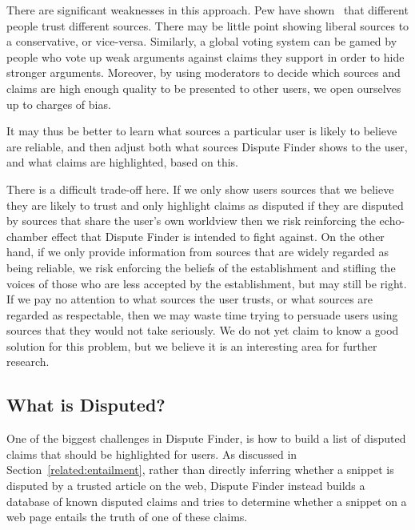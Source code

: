 \documentclass{www2010-submission}
\newcommand{\todo}[1]{}
\begin{document}
\todo{study result: verify}
There are significant weaknesses in this approach. Pew have shown~\cite{pew-news} that different people trust different sources. There may be little point showing liberal sources to a conservative, or vice-versa. Similarly, a global voting system can be gamed by people who vote up weak arguments against claims they support in order to hide stronger arguments. Moreover, by using moderators to decide which sources and claims are high enough quality to be presented to other users, we open ourselves up to charges of bias.

It may thus be better to learn what sources a particular user is likely to believe are reliable, and then adjust both what sources Dispute Finder shows to the user, and what claims are highlighted, based on this.

There is a difficult trade-off here. If we only show users sources that we believe they are likely to trust and only highlight claims as disputed if they are disputed by sources that share the user's own worldview then we risk reinforcing the echo-chamber effect that Dispute Finder is intended to fight against. On the other hand, if we only provide information from sources that are widely regarded as being reliable, we risk enforcing the beliefs of the establishment and stifling the voices of those who are less accepted by the establishment, but may still be right. If we pay no attention to what sources the user trusts, or what sources are regarded as respectable, then we may waste time trying to persuade users using sources that they would not take seriously. We do not yet claim to know a good solution for this problem, but we believe it is an interesting area for further research.

\todo{Cite Pew Research study saying people like to read news that supports their own point of view, but many others like neutral sources. http://people-press.org/report/?pageid=1353}


\subsection{What is Disputed?}

One of the biggest challenges in Dispute Finder, is how to build a list of disputed claims that should be highlighted for users. As discussed in Section~\ref{related:entailment}, rather than directly inferring whether a snippet is disputed by a trusted article on the web, Dispute Finder instead builds a database of known disputed claims and tries to determine whether a snippet on a web page entails the truth of one of these claims.
\end{document}
